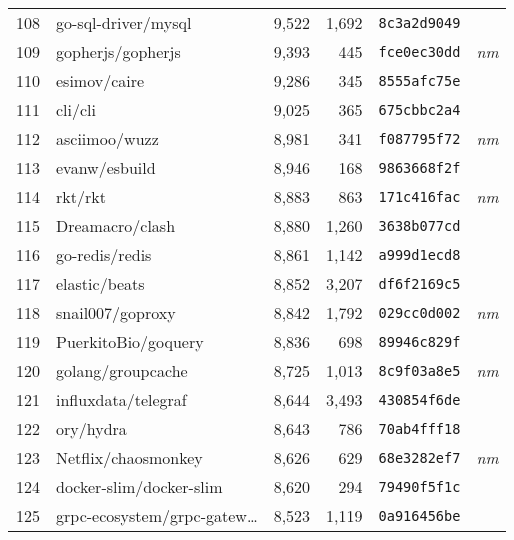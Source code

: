 {\begin{supertabular}{llrrll}
        108 &                go-sql-driver/mysql &  9,522 &  1,692 &  \texttt{8c3a2d9049} &              \\
        109 &                  gopherjs/gopherjs &  9,393 &    445 &  \texttt{fce0ec30dd} &  \textit{nm} \\
        110 &                       esimov/caire &  9,286 &    345 &  \texttt{8555afc75e} &              \\
        111 &                            cli/cli &  9,025 &    365 &  \texttt{675cbbc2a4} &              \\
        112 &                      asciimoo/wuzz &  8,981 &    341 &  \texttt{f087795f72} &  \textit{nm} \\
        113 &                      evanw/esbuild &  8,946 &    168 &  \texttt{9863668f2f} &              \\
        114 &                            rkt/rkt &  8,883 &    863 &  \texttt{171c416fac} &  \textit{nm} \\
        115 &                    Dreamacro/clash &  8,880 &  1,260 &  \texttt{3638b077cd} &              \\
        116 &                     go-redis/redis &  8,861 &  1,142 &  \texttt{a999d1ecd8} &              \\
        117 &                      elastic/beats &  8,852 &  3,207 &  \texttt{df6f2169c5} &              \\
        118 &                   snail007/goproxy &  8,842 &  1,792 &  \texttt{029cc0d002} &  \textit{nm} \\
        119 &                PuerkitoBio/goquery &  8,836 &    698 &  \texttt{89946c829f} &              \\
        120 &                  golang/groupcache &  8,725 &  1,013 &  \texttt{8c9f03a8e5} &  \textit{nm} \\
        121 &                influxdata/telegraf &  8,644 &  3,493 &  \texttt{430854f6de} &              \\
        122 &                          ory/hydra &  8,643 &    786 &  \texttt{70ab4fff18} &              \\
        123 &                Netflix/chaosmonkey &  8,626 &    629 &  \texttt{68e3282ef7} &  \textit{nm} \\
        124 &            docker-slim/docker-slim &  8,620 &    294 &  \texttt{79490f5f1c} &              \\
        125 &    grpc-ecosystem/grpc-gatew\ldots &  8,523 &  1,119 &  \texttt{0a916456be} &              \\

\end{supertabular}}
